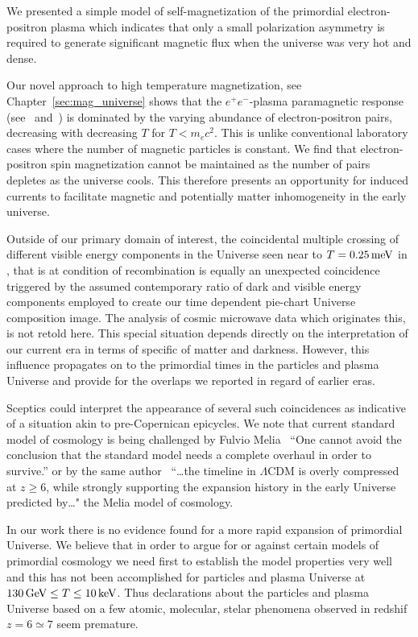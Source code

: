 We presented a simple model of self-magnetization of the primordial electron-positron plasma which indicates that only a small polarization asymmetry is required to generate significant magnetic flux when the universe was very hot and dense.

Our novel approach to high temperature magnetization, see Chapter~\ref{sec:mag_universe} shows that the $e^{+}e^{-}$-plasma paramagnetic response (see~ and~) is dominated by the varying abundance of electron-positron pairs, decreasing with decreasing $T$ for $T\!<\!m_{e}c^2$. This is unlike conventional laboratory cases where the number of magnetic particles is constant. We find that electron-positron spin magnetization cannot be maintained as the number of pairs depletes as the universe cools. This therefore presents an opportunity for induced currents to facilitate magnetic and potentially matter inhomogeneity in the early universe. 
 
Outside of our primary domain of interest, the coincidental multiple crossing of different visible energy components in the Universe seen near to $T=0.25\text{\,meV}$ in , that is at condition of recombination is equally an unexpected coincidence triggered by the assumed contemporary ratio of dark and visible energy components employed to create our time dependent pie-chart Universe composition image. The analysis of cosmic microwave data which originates this, is not retold here. This special situation depends directly on the interpretation of our current era in terms of specific of matter and darkness. However, this influence propagates on to the primordial times in the particles and plasma Universe and provide for the overlaps we reported in regard of earlier eras.

Sceptics could interpret the appearance of several such coincidences as indicative of a situation akin to pre-Copernican epicycles. We note that current standard model of cosmology is being challenged by Fulvio Melia~\cite{Melia:2022itm} ``One cannot avoid the conclusion that the standard model needs a complete overhaul in order to survive.'' or by the same author~\cite{Melia:2024rzy} ``\ldots the timeline in $\Lambda$CDM is overly compressed at $z\ge 6$, while strongly supporting the expansion history in the early Universe predicted by\ldots" the Melia model of cosmology. 

In our work there is no evidence found for a more rapid expansion of primordial Universe. We believe that in order to argue for or against certain models of primordial cosmology we need first to establish the model properties very well and this has not been accomplished for particles and plasma Universe at $130\text{\,GeV}\le T\le 10\text{\,keV}$. Thus declarations about the particles and plasma Universe based on a few atomic, molecular, stelar phenomena observed in redshif $z=6\simeq7$ seem premature. 
